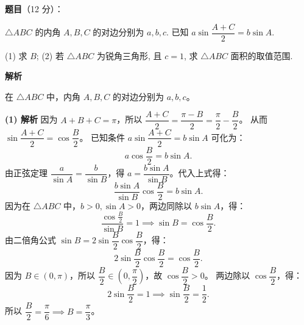 \begin{answer}

\textbf{题目}（12 分）：

$\triangle ABC$ 的内角 $A, B, C$ 的对边分别为 $a, b, c$. 已知 $a \sin \dfrac{A+C}{2} = b \sin A$.

(1) 求 $B$;  
(2) 若 $\triangle ABC$ 为锐角三角形, 且 $c = 1$, 求 $\triangle ABC$ 面积的取值范围.

\textbf{解析}

在 $\triangle ABC$ 中，内角 $A, B, C$ 的对边分别为 $a, b, c$。

\textbf{(1) 解析}
因为 $A + B + C = \pi$，所以 $\dfrac{A+C}{2} = \dfrac{\pi - B}{2} = \dfrac{\pi}{2} - \dfrac{B}{2}$。
从而 $\sin\dfrac{A+C}{2} = \cos\dfrac{B}{2}$。
已知条件 $a \sin \dfrac{A+C}{2} = b \sin A$ 可化为：
\nopagebreak[4]
\[a \cos\frac{B}{2} = b \sin A.\]
由正弦定理 $\dfrac{a}{\sin A} = \dfrac{b}{\sin B}$，得 $a = \dfrac{b \sin A}{\sin B}$。代入上式得：
\nopagebreak[4]
\[\frac{b \sin A}{\sin B} \cos\frac{B}{2} = b \sin A.\]
因为在 $\triangle ABC$ 中，$b > 0, \sin A > 0$，两边同除以 $b \sin A$，得：
\nopagebreak[4]
\[\frac{\cos\frac{B}{2}}{\sin B} = 1 \implies \sin B = \cos\frac{B}{2}.\]
由二倍角公式 $\sin B = 2\sin\dfrac{B}{2}\cos\dfrac{B}{2}$，得：
\nopagebreak[4]
\[2\sin\frac{B}{2}\cos\frac{B}{2} = \cos\frac{B}{2}.\]
因为 $B \in (0, \pi)$，所以 $\dfrac{B}{2} \in \left(0, \dfrac{\pi}{2}\right)$，故 $\cos\dfrac{B}{2} > 0$。
两边除以 $\cos\dfrac{B}{2}$，得：
\nopagebreak[4]
\[2\sin\frac{B}{2} = 1 \implies \sin\frac{B}{2} = \frac{1}{2}.\]
所以 $\dfrac{B}{2} = \dfrac{\pi}{6} \implies B = \dfrac{\pi}{3}$。


\end{answer}
